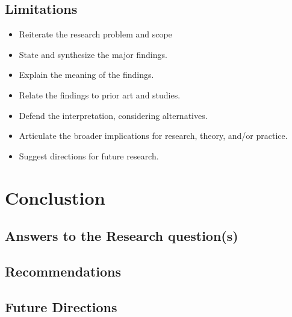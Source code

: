 \documentclass[lettersize,journal]{IEEEtran}
\begin{document}
\subsection{Limitations}
\begin{itemize}
	\item Reiterate the research problem and scope
	\item State and synthesize the major findings.
	\item Explain the meaning of the findings.
	\item Relate the findings to prior art and studies.
	\item Defend the interpretation, considering alternatives.
	\item Articulate the broader implications for research, theory, and/or practice.
	\item Suggest directions for future research.

		\end{itemize}




\section{Conclustion}
\subsection{Answers to the Research question(s)}
\subsection{Recommendations}
\subsection{Future Directions}


\end{document}
